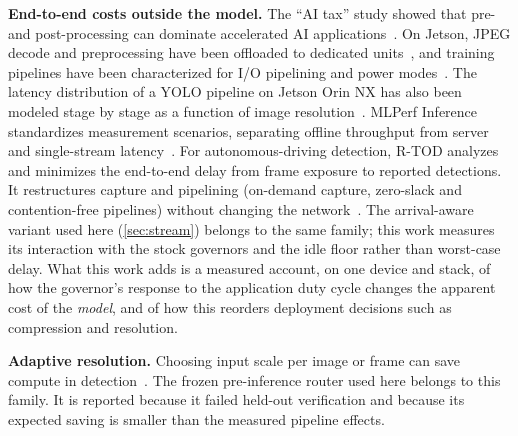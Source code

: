 \textbf{End-to-end costs outside the model.}
The ``AI tax'' study showed that pre- and post-processing can dominate
accelerated AI applications~\cite{richins2020aitax}. On Jetson, JPEG
decode and preprocessing have been offloaded to dedicated
units~\cite{chen2026nvjpeg}, and training pipelines have been
characterized for I/O pipelining and power modes~\cite{prashanthi2023jetson}.
The latency distribution of a YOLO pipeline on Jetson Orin NX has also
been modeled stage by stage as a function of image
resolution~\cite{zhang2026resolution}.
MLPerf Inference standardizes measurement scenarios, separating offline
throughput from server and single-stream latency~\cite{reddi2020mlperf}.
For autonomous-driving detection, R-TOD analyzes and minimizes the
end-to-end delay from frame exposure to reported detections. It
restructures capture and pipelining (on-demand capture, zero-slack and
contention-free pipelines) without changing the
network~\cite{jang2020rtod}. The arrival-aware variant used here
(\cref{sec:stream}) belongs to the same family; this work measures its
interaction with the stock governors and the idle floor rather than
worst-case delay. What this work adds is a measured account, on one
device and stack, of how the governor's response to the application
duty cycle changes the apparent cost of the \emph{model}, and of how
this reorders deployment decisions such as compression and resolution.

\textbf{Adaptive resolution.}
Choosing input scale per image or frame can save compute in
detection~\cite{chin2019adascale,zhu2021drnet}. The frozen
pre-inference router used here belongs to this family. It is reported
because it failed held-out verification and because its
expected saving is smaller than the measured pipeline effects.

